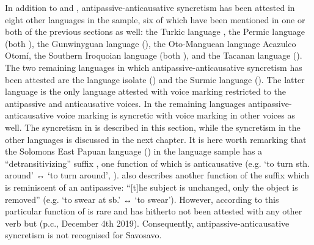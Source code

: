 In addition to  and , antipassive-anticausative syncretism has been attested in eight other languages in the sample, six of which have been mentioned in one or both of the previous sections as well: the Turkic language , the Permic language  (both ), the Gunwinyguan language  (), the Oto-Manguean language Acazulco Otomí, the Southern Iroquoian language  (both ), and the Tacanan language  (). The two remaining languages in which antipassive-anticausative syncretism has been attested are the language isolate  () and the Surmic language  (). The latter language is the only language attested with voice marking restricted to the antipassive and anticausative voices. In the remaining languages antipassive-anticausative voice marking is syncretic with voice marking in other voices as well. The syncretism in  is described in this section, while the syncretism in the other languages is discussed in the next chapter. It is here worth remarking that the Solomons East Papuan language  () in the language sample has a “detransitivizing” suffix , one function of which is anticausative (e.g.  ‘to turn sth. around’ ↔  ‘to turn around’, \citealt[275, 376]{wegener:2012}). \citet[171]{wegener:2012} also describes another function of the suffix which is reminiscent of an antipassive: “[t]he subject is unchanged, only the object is removed” (e.g.  ‘to swear at sb.’ ↔  ‘to swear’). However, according to \citeauthor{wegener:2012} this particular function of  is rare and has hitherto not been attested with any other verb but  (p.c., December 4th 2019). Consequently, antipassive-anticausative syncretism is not recognised for Savosavo.

